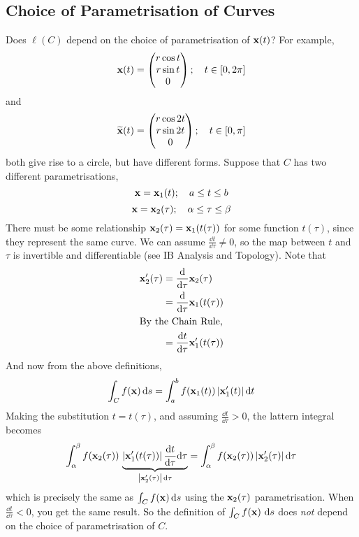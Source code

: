 \subsection{Choice of Parametrisation of Curves}
Does \(\ell(C)\) depend on the choice of parametrisation of \(\vb x(t)\)? For example,
\[
	\vb x(t) = \begin{pmatrix}
		r\cos t \\ r \sin t \\ 0
	\end{pmatrix};\quad t \in [0, 2\pi]
\]
and
\[
	\widetilde{\vb x}(t) = \begin{pmatrix}
		r\cos 2t \\ r \sin 2t \\ 0
	\end{pmatrix};\quad t \in [0, \pi]
\]
both give rise to a circle, but have different forms.
Suppose that \(C\) has two different parametrisations,
\[
	\vb x = \vb x_1(t);\quad a \leq t \leq b
\]
\[
	\vb x = \vb x_2(\tau);\quad \alpha \leq \tau \leq \beta
\]
There must be some relationship \(\vb x_2(\tau) = \vb x_1(t(\tau))\) for some function \(t(\tau)\), since they represent the same curve.
We can assume \(\frac{\dd{t}}{\dd \tau} \neq 0\), so the map between \(t\) and \(\tau\) is invertible and differentiable (see IB Analysis and Topology).
Note that
\begin{align*}
	\vb x_2'(\tau) & = \frac{\dd}{\dd \tau}\vb x_2(\tau)        \\
	               & = \frac{\dd}{\dd \tau}\vb x_1(t(\tau))     \\
	\intertext{By the Chain Rule,}
	               & = \frac{\dd{t}}{\dd \tau}\vb x_1'(t(\tau))
\end{align*}
And now from the above definitions,
\[
	\int_C f(\vb x) \dd{s} = \int_a^b f(\vb x_1(t)) \, \abs{\vb x_1'(t)} \dd{t}
\]
Making the substitution \(t = t(\tau)\), and assuming \(\frac{\dd{t}}{\dd \tau} > 0\), the lattern integral becomes
\[
	\int_\alpha^\beta f(\vb x_2(\tau)) \, \underbrace{\abs{\vb x_1'(t(\tau))} \,\frac{\dd{t}}{\dd \tau}\dd \tau}_{\abs{\vb x_2'(\tau)}\,\dd \tau} = \int_\alpha^\beta f(\vb x_2(\tau)) \, \abs{\vb x_2'(\tau)} \,\dd \tau
\]
which is precisely the same as \(\int_C f(\vb x) \dd{s}\) using the \(\vb x_2(\tau)\) parametrisation.
When \(\frac{\dd{t}}{\dd \tau} < 0\), you get the same result.
So the definition of \(\int_C f(\vb x) \, \dd{s}\) does \textit{not} depend on the choice of parametrisation of \(C\).
